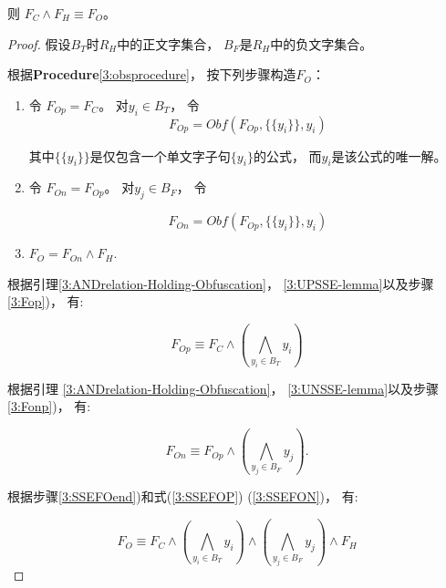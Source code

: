 则 $F_C\wedge F_H \equiv F_O$。
\begin{proof}

假设$B_T$时$R_H$中的正文字集合，
$B_F$是$R_H$中的负文字集合。

根据\textbf{Procedure}\ref{3:obsprocedure}， 按下列步骤构造$F_O$：

\begin{enumerate}
\item \label{3:Fop}
令 $F_{Op}=F_C$。
对$y_i \in B_T$，
令
\begin{equation}
F_{Op}=Obf(F_{Op},\{\{y_i\}\},y_i)
\end{equation}

其中$\{\{y_i\}\}$是仅包含一个单文字子句$\{y_i\}$的公式，
而$y_i$是该公式的唯一解。

\item  \label{3:Fonp}
令 $F_{On}=F_{Op}$。
对$y_j \in B_F$， 令

\begin{equation}
F_{On}=Obf(F_{Op},\{\{y_i\}\},y_i)
\end{equation}

\item  \label{3:SSEFOend}
$F_{O}=F_{On}\wedge F_H$.
\end{enumerate}

根据引理\ref{3:ANDrelation-Holding-Obfuscation}， \ref{3:UPSSE-lemma}以及步骤\ref{3:Fop})， 有:

\begin{equation}\label{3:SSEFOP}
F_{Op} \equiv F_C\wedge (\bigwedge_{y_i\in B_T}y_i)
\end{equation}

根据引理 \ref{3:ANDrelation-Holding-Obfuscation}， \ref{3:UNSSE-lemma}以及步骤\ref{3:Fonp})， 有:

\begin{equation}\label{3:SSEFON}
F_{On} \equiv F_{Op}\wedge (\bigwedge_{y_j\in B_F} y_j).
\end{equation}

根据步骤\ref{3:SSEFOend})和式(\ref{3:SSEFOP}) (\ref{3:SSEFON})， 有:

\begin{equation}\label{3:SSEFO}
F_{O} \equiv F_C \wedge
(\bigwedge_{y_i\in B_T}y_i)\wedge
(\bigwedge_{y_j\in B_F} y_j) \wedge F_H
\end{equation}


\end{proof}
